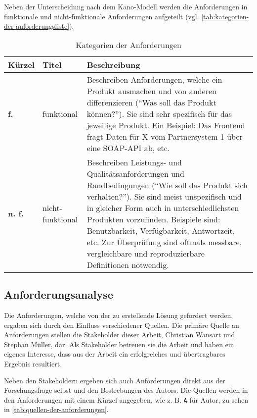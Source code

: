 Neben der Unterscheidung nach dem Kano-Modell werden die Anforderungen in funktionale und nicht-funktionale Anforderungen \cite{FunktionaleUndNichtFunktionaleAnforderungen} aufgeteilt (vgl. \autoref{tab:kategorien-der-anforderungsliste}).

\begin{table}[H]
\begin{tabular}{ |p{1.15cm}|p{2.75cm}|p{9.6cm}| }
	\hline
	Kürzel & Titel & Beschreibung \\
	\hline
	\textbf{f.} & funktional & Beschreiben Anforderungen, welche ein Produkt ausmachen und von anderen differenzieren (\enquote{Was soll das Produkt können?}). Sie sind sehr spezifisch für das jeweilige Produkt. Ein Beispiel: Das Frontend fragt Daten für X vom Partnersystem 1 über eine SOAP-API ab, etc.\\
	\hline
	\textbf{n. f.} & nicht-funktional & Beschreiben Leistungs- und Qualitätsanforderungen und Randbedingungen (\enquote{Wie soll das Produkt sich verhalten?}). Sie sind meist unspezifisch und in gleicher Form auch in unterschiedlichsten Produkten vorzufinden. Beispiele sind: Benutzbarkeit, Verfügbarkeit, Antwortzeit, etc. Zur Überprüfung sind oftmals messbare, vergleichbare und reproduzierbare Definitionen notwendig. \\
	\hline
\end{tabular}
 \captionsetup{justification=centering}
  \caption{Kategorien der Anforderungen}
   \label{tab:kategorien-der-anforderungsliste}
\end{table}
	
\subsection{Anforderungsanalyse}

Die Anforderungen, welche von der zu erstellende Lösung gefordert werden, ergaben sich durch den Einfluss verschiedener Quellen. Die primäre Quelle an Anforderungen stellen die Stakeholder dieser Arbeit, Christian Wansart und Stephan Müller, dar. Als Stakeholder betreuen sie die Arbeit und haben ein eigenes Interesse, dass aus der Arbeit ein erfolgreiches und übertragbares Ergebnis resultiert.

Neben den Stakeholdern ergeben sich auch Anforderungen direkt aus der Forschungsfrage selbst und den Bestrebungen des Autors. Die Quellen werden in den Anforderungen mit einem Kürzel angegeben, wie z. B. \texttt{A} für Autor, zu sehen in \autoref{tab:quellen-der-anforderungen}.

